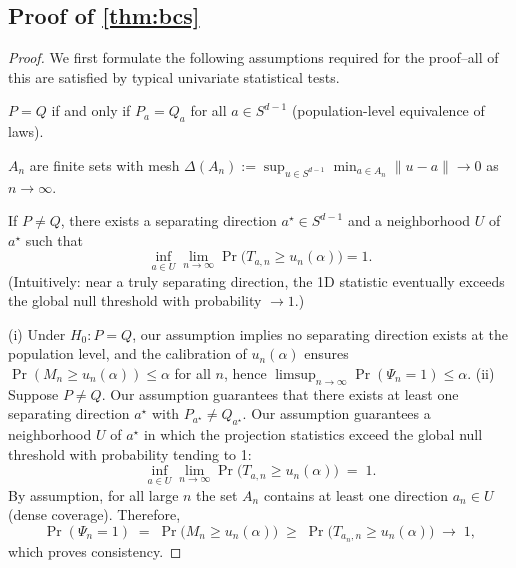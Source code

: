 \subsection{Proof of \cref{thm:bcs}}
\label{proof:bcs}
\begin{proof}
We first formulate the following assumptions required for the proof--all of this are satisfied by typical univariate statistical tests.

$P=Q$ if and only if $P_a=Q_a$ for all $a\in S^{d-1}$ (population-level equivalence of laws).


$A_n$ are finite sets with mesh $\Delta(A_n):=\sup_{u\in S^{d-1}} \min_{a\in A_n}\|u-a\| \to 0$ as $n\to\infty$.





If $P\neq Q$, there exists a separating direction $a^\star\in S^{d-1}$ and a neighborhood $U$ of $a^\star$ such that
\[
\inf_{a\in U}\lim_{n\to\infty}\Pr\big(T_{a,n} \ge u_n(\alpha)\big)=1.
\]
(Intuitively: near a truly separating direction, the 1D statistic eventually exceeds the global null threshold with probability $\to 1$.)

(i) Under $H_0:P=Q$, our assumption implies no separating direction exists at the population level, and the calibration of $u_n(\alpha)$ ensures
$\Pr(M_n \ge u_n(\alpha)) \le \alpha$ for all $n$, hence
$\limsup_{n\to\infty}\Pr(\Psi_n=1)\le \alpha$.
(ii) Suppose $P\neq Q$.
Our assumption guarantees that there exists at least one separating direction $a^\star$ with $P_{a^\star}\neq Q_{a^\star}$.
Our assumption  guarantees a neighborhood $U$ of $a^\star$ in which the projection statistics exceed the global null threshold with probability tending to 1:
\[
\inf_{a\in U}\lim_{n\to\infty}\Pr\big(T_{a,n} \ge u_n(\alpha)\big) \;=\; 1.
\]
By assumption, for all large $n$ the set $A_n$ contains at least one direction $a_n\in U$ (dense coverage).
Therefore,
\[
\Pr(\Psi_n=1) \;=\; \Pr\big(M_n \ge u_n(\alpha)\big)
\;\ge\; \Pr\big( T_{a_n,n} \ge u_n(\alpha) \big)
\;\longrightarrow\; 1,
\]
which proves consistency.
\end{proof}



